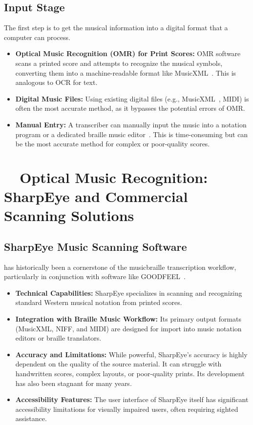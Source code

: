\subsection{Input Stage}\label{ch10:ssec:input-stage}
The first step is to get the musical information into a digital format that a computer can process.
\begin{itemize}
	\item \textbf{Optical Music Recognition (OMR) for Print Scores:} \gls{OMR} software scans a printed score and attempts to recognize the musical symbols, converting them into a machine-readable format like \gls{MusicXML}~\supercite{researchgate-polyphonic-omr, musescore-omr}. This is analogous to \gls{OCR} for text.
	\item \textbf{Digital Music Files:} Using existing digital files (e.g., \gls{MusicXML}~\supercite{daisy-musicxml}, MIDI) is often the most accurate method, as it bypasses the potential errors of \gls{OMR}.
	\item \textbf{Manual Entry:} A transcriber can manually input the music into a notation program or a dedicated braille music editor~\supercite{braillemusiceditor, braillemusicnotator}. This is time-consuming but can be the most accurate method for complex or poor-quality scores.
\end{itemize}

\section{~~Optical Music Recognition: SharpEye and Commercial Scanning Solutions}\label{ch10:sec:omr-solutions}

\subsection{SharpEye Music Scanning Software}\label{ch10:ssec:sharpeye}
 has historically been a cornerstone of the \gls{musicbraille} transcription workflow, particularly in conjunction with software like GOODFEEL~\supercite{dancingdots-goodfeel}.
\begin{itemize}
	\item \textbf{Technical Capabilities:} SharpEye specializes in scanning and recognizing standard Western musical notation from printed scores.
	\item \textbf{Integration with Braille Music Workflow:} Its primary output formats (\gls{MusicXML}, NIFF, and MIDI) are designed for import into music notation editors or braille translators.
	\item \textbf{Accuracy and Limitations:} While powerful, SharpEye's accuracy is highly dependent on the quality of the source material. It can struggle with handwritten scores, complex layouts, or poor-quality prints. Its development has also been stagnant for many years.
	\item \textbf{Accessibility Features:} The user interface of SharpEye itself has significant accessibility limitations for visually impaired users, often requiring sighted assistance.
\end{itemize}


